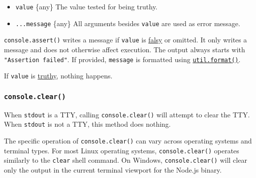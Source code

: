 \begin{itemize}
\tightlist
\item
  \texttt{value} \{any\} The value tested for being truthy.
\item
  \texttt{...message} \{any\} All arguments besides \texttt{value} are
  used as error message.
\end{itemize}

\texttt{console.assert()} writes a message if \texttt{value} is
\href{https://developer.mozilla.org/en-US/docs/Glossary/Falsy}{falsy} or
omitted. It only writes a message and does not otherwise affect
execution. The output always starts with \texttt{"Assertion\ failed"}.
If provided, \texttt{message} is formatted using
\href{util.md\#utilformatformat-args}{\texttt{util.format()}}.

If \texttt{value} is
\href{https://developer.mozilla.org/en-US/docs/Glossary/Truthy}{truthy},
nothing happens.

\begin{Shaded}
\begin{Highlighting}[]
\NormalTok{(}\OperatorTok{,} \NormalTok{)}\OperatorTok{;}

\NormalTok{(}\OperatorTok{,} \OperatorTok{,} \SpecialCharTok{\textbackslash{}\textquotesingle{}}\NormalTok{)}\OperatorTok{;}

\NormalTok{()}\OperatorTok{;}
\end{Highlighting}
\end{Shaded}

\subsubsection{\texorpdfstring{\texttt{console.clear()}}{console.clear()}}\label{console.clear}

When \texttt{stdout} is a TTY, calling \texttt{console.clear()} will
attempt to clear the TTY. When \texttt{stdout} is not a TTY, this method
does nothing.

The specific operation of \texttt{console.clear()} can vary across
operating systems and terminal types. For most Linux operating systems,
\texttt{console.clear()} operates similarly to the \texttt{clear} shell
command. On Windows, \texttt{console.clear()} will clear only the output
in the current terminal viewport for the Node.js binary.

